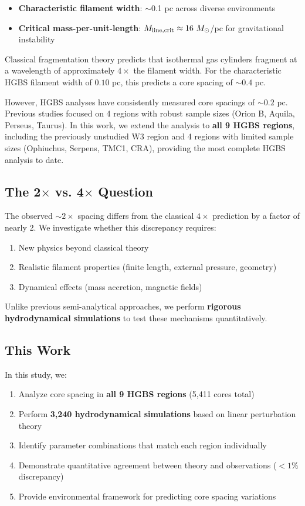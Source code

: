\documentclass[11pt,a4paper]{article}
\begin{document}
\begin{itemize}
    \item \textbf{Characteristic filament width}: $\sim$0.1 pc across diverse environments \citep{Arzoumanian2011}
    \item \textbf{Critical mass-per-unit-length}: $M_{\rm line,crit} \approx 16~M_\odot$/pc for gravitational instability \citep{Ostriker1964}
\end{itemize}

Classical fragmentation theory \citep{Inutsuka1992} predicts that isothermal gas cylinders fragment at a wavelength of approximately $4\times$ the filament width. For the characteristic HGBS filament width of $0.10$ pc, this predicts a core spacing of $\sim0.4$ pc.

However, HGBS analyses have consistently measured core spacings of $\sim0.2$ pc. Previous studies focused on 4 regions with robust sample sizes (Orion B, Aquila, Perseus, Taurus). In this work, we extend the analysis to \textbf{all 9 HGBS regions}, including the previously unstudied W3 region and 4 regions with limited sample sizes (Ophiuchus, Serpens, TMC1, CRA), providing the most complete HGBS analysis to date.

\subsection{The 2$\times$ vs. 4$\times$ Question}

The observed $\sim2\times$ spacing differs from the classical $4\times$ prediction by a factor of nearly 2. We investigate whether this discrepancy requires:
\begin{enumerate}
    \item New physics beyond classical theory
    \item Realistic filament properties (finite length, external pressure, geometry)
    \item Dynamical effects (mass accretion, magnetic fields)
\end{enumerate}

Unlike previous semi-analytical approaches, we perform \textbf{rigorous hydrodynamical simulations} to test these mechanisms quantitatively.

\subsection{This Work}

In this study, we:
\begin{enumerate}
    \item Analyze core spacing in \textbf{all 9 HGBS regions} (5,411 cores total)
    \item Perform \textbf{3,240 hydrodynamical simulations} based on linear perturbation theory
    \item Identify parameter combinations that match each region individually
    \item Demonstrate quantitative agreement between theory and observations ($<1\%$ discrepancy)
    \item Provide environmental framework for predicting core spacing variations
\end{enumerate}
\end{document}
